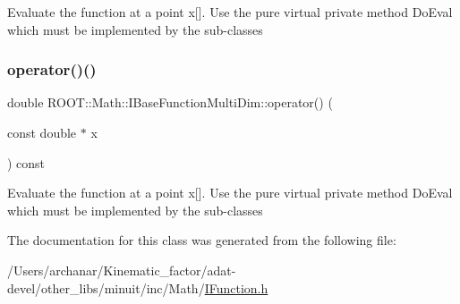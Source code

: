 Evaluate the function at a point x\mbox{[}\mbox{]}. Use the pure virtual private method Do\+Eval which must be implemented by the sub-\/classes \mbox{\label{classROOT_1_1Math_1_1IBaseFunctionMultiDim_a7efd1892dc6473b3f8aaaff3cbb8bb2f}} 
\subsubsection{\texorpdfstring{operator()()}{operator()()}\hspace{0.1cm}{\footnotesize\ttfamily [3/3]}}
{\footnotesize\ttfamily double R\+O\+O\+T\+::\+Math\+::\+I\+Base\+Function\+Multi\+Dim\+::operator() (\begin{DoxyParamCaption}\item[{const double $\ast$}]{x }\end{DoxyParamCaption}) const\hspace{0.3cm}{\ttfamily [inline]}}

Evaluate the function at a point x\mbox{[}\mbox{]}. Use the pure virtual private method Do\+Eval which must be implemented by the sub-\/classes 

The documentation for this class was generated from the following file\+:\begin{DoxyCompactItemize}
\item 
/\+Users/archanar/\+Kinematic\+\_\+factor/adat-\/devel/other\+\_\+libs/minuit/inc/\+Math/\mbox{\hyperlink{adat-devel_2other__libs_2minuit_2inc_2Math_2IFunction_8h}{I\+Function.\+h}}\end{DoxyCompactItemize}
